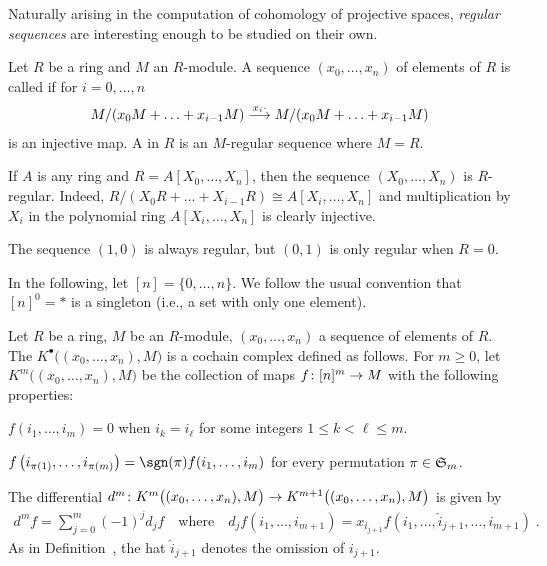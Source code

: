 \documentclass[a4paper,parskip=half,numbers=enddot, DIV=12]{scrreprt}
\renewcommand{\leq}{\leqslant}
\renewcommand{\geq}{\geqslant}
\begin{document}
Naturally arising in the computation of cohomology of projective spaces, \emph{regular sequences} are interesting enough to be studied on their own.
\begin{defi}
	Let $R$ be a ring and $M$ an $R$-module. A sequence $(x_0,\ldots,x_n)$ of elements of $R$ is called  if for $i=0,\ldots,n$
	\begin{align*}
		M/(x_0M+\ldots+x_{i-1}M)\morphism[x_i\cdot]M/(x_0M+\ldots+x_{i-1}M)
	\end{align*}
	is an injective map. A  in $R$ is an $M$-regular sequence where $M=R$.
\end{defi}
\begin{example}
	\begin{alphanumerate}
		\item {}If $A$ is any ring and $R=A[X_0,\ldots,X_n]$, then the sequence $(X_0,\ldots,X_n)$ is $R$-regular. Indeed, $R/(X_0R+\ldots+X_{i-1}R)\cong A[X_i,\ldots,X_n]$ and multiplication by $X_i$ in the polynomial ring $A[X_i,\ldots,X_n]$ is clearly injective.
		\item The sequence $(1,0)$ is always regular, but $(0,1)$ is only regular when $R=0$.
	\end{alphanumerate}
\end{example}
In the following, let $[n]=\{0,\ldots,n\}$. We follow the usual convention that $[n]^0=*$ is a singleton (i.e., a set with only one element).
\begin{defi}
	Let $R$ be a ring, $M$ be an $R$-module, $(x_0,\ldots,x_n)$ a sequence of elements of $R$. The  $K^\bullet\big((x_0,\ldots,x_n),M\big)$ is a cochain complex defined as follows. For $m\geq0$, let $K^m\big((x_0,\ldots,x_n),M\big)$ be the collection of maps $f\colon [n]^m\morphism M$ with the following properties:
	\begin{alphanumerate}
		\item $f(i_1,\ldots,i_m)=0$ when $i_k=i_\ell$ for some integers $1\leq k<\ell\leq m$.
		\item $f\left(i_{\pi(1)},\ldots,i_{\pi(m)}\right)=\sgn(\pi)f(i_1,\ldots,i_m)$ for every permutation $\pi\in\mathfrak{S}_m$.
	\end{alphanumerate}
	The differential $d^m\colon K^m\big((x_0,\ldots,x_n),M\big)\morphism K^{m+1}\big((x_0,\ldots,x_n),M\big)$ is given by 
	\begin{align*}
		d^mf=\sum_{j=0}^m(-1)^jd_jf\quad\text{where}\quad d_jf(i_1,\ldots,i_{m+1})=x_{i_{j+1}}f(i_1,\ldots,\hat{i}_{j+1},\ldots,i_{m+1})\;.
	\end{align*}
	As in Definition~, the hat $\hat{i}_{j+1}$ denotes the omission of $i_{j+1}$.
\end{defi} 
\end{document}
